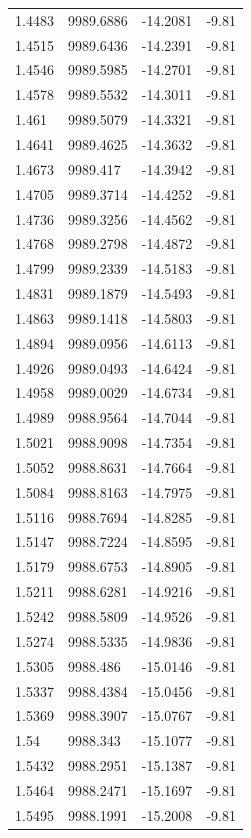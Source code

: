 \begin{table}[H]
\begin{tabular}{llll}
1.4483 & 9989.6886 & -14.2081 & -9.81 \\
1.4515 & 9989.6436 & -14.2391 & -9.81 \\
1.4546 & 9989.5985 & -14.2701 & -9.81 \\
1.4578 & 9989.5532 & -14.3011 & -9.81 \\
1.461 & 9989.5079 & -14.3321 & -9.81 \\
1.4641 & 9989.4625 & -14.3632 & -9.81 \\
1.4673 & 9989.417 & -14.3942 & -9.81 \\
1.4705 & 9989.3714 & -14.4252 & -9.81 \\
1.4736 & 9989.3256 & -14.4562 & -9.81 \\
1.4768 & 9989.2798 & -14.4872 & -9.81 \\
1.4799 & 9989.2339 & -14.5183 & -9.81 \\
1.4831 & 9989.1879 & -14.5493 & -9.81 \\
1.4863 & 9989.1418 & -14.5803 & -9.81 \\
1.4894 & 9989.0956 & -14.6113 & -9.81 \\
1.4926 & 9989.0493 & -14.6424 & -9.81 \\
1.4958 & 9989.0029 & -14.6734 & -9.81 \\
1.4989 & 9988.9564 & -14.7044 & -9.81 \\
1.5021 & 9988.9098 & -14.7354 & -9.81 \\
1.5052 & 9988.8631 & -14.7664 & -9.81 \\
1.5084 & 9988.8163 & -14.7975 & -9.81 \\
1.5116 & 9988.7694 & -14.8285 & -9.81 \\
1.5147 & 9988.7224 & -14.8595 & -9.81 \\
1.5179 & 9988.6753 & -14.8905 & -9.81 \\
1.5211 & 9988.6281 & -14.9216 & -9.81 \\
1.5242 & 9988.5809 & -14.9526 & -9.81 \\
1.5274 & 9988.5335 & -14.9836 & -9.81 \\
1.5305 & 9988.486 & -15.0146 & -9.81 \\
1.5337 & 9988.4384 & -15.0456 & -9.81 \\
1.5369 & 9988.3907 & -15.0767 & -9.81 \\
1.54 & 9988.343 & -15.1077 & -9.81 \\
1.5432 & 9988.2951 & -15.1387 & -9.81 \\
1.5464 & 9988.2471 & -15.1697 & -9.81 \\
1.5495 & 9988.1991 & -15.2008 & -9.81 \\

\end{tabular}
\end{table}
